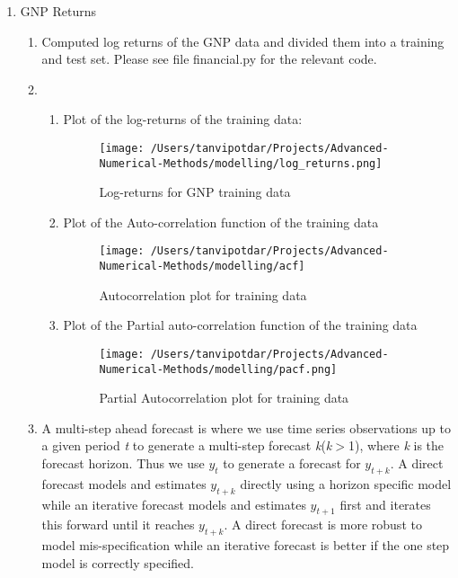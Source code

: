 \documentclass{article}
\begin{document}
\begin{enumerate}[label=1.\arabic*]
\item GNP Returns
\begin{enumerate}[label=(\alph*)]
\item Computed log returns of the GNP data and divided them into a training and test set. Please see file financial.py for the relevant code.
\item 
\begin{enumerate}[label=(\roman*)]
\item Plot of the log-returns of the training data:
\begin{figure}[!htbp]
    \centering
    \hspace*{-1cm}
    \texttt{[image: /Users/tanvipotdar/Projects/Advanced-Numerical-Methods/modelling/log\_returns.png]}
    \caption{Log-returns for GNP training data}
\end{figure}
\item Plot of the Auto-correlation function of the training data
\begin{figure}[!htbp]
    \centering
    \vspace*{-1cm}
    \hspace*{-1cm}
    \texttt{[image: /Users/tanvipotdar/Projects/Advanced-Numerical-Methods/modelling/acf]}
    \caption{Autocorrelation plot for training data}
\end{figure}
\item Plot of the Partial auto-correlation function of the training data
\begin{figure}[!htbp]
    \centering
    \vspace*{-0.5cm}
    \hspace*{-1cm}
    \texttt{[image: /Users/tanvipotdar/Projects/Advanced-Numerical-Methods/modelling/pacf.png]}
    \caption{Partial Autocorrelation plot for training data}
\end{figure}
\end{enumerate}
\item A multi-step ahead forecast is where we use time series observations up to a given period \textit{t} to generate a multi-step forecast \textit{k}(\textit{k}$>$1), where \textit{k} is the forecast horizon. Thus we use \textit{$y_t$} to generate a forecast for \textit{$y_{t+k}$}. A direct forecast models and estimates \textit{$y_{t+k}$} directly using a horizon specific model while an iterative forecast models and estimates \textit{$y_{t+1}$} first and iterates this forward until it reaches \textit{$y_{t+k}$}. A direct forecast is more robust to model mis-specification while an iterative forecast is better if the one step model is correctly specified. 

\end{enumerate}
\end{enumerate}
\end{document}
